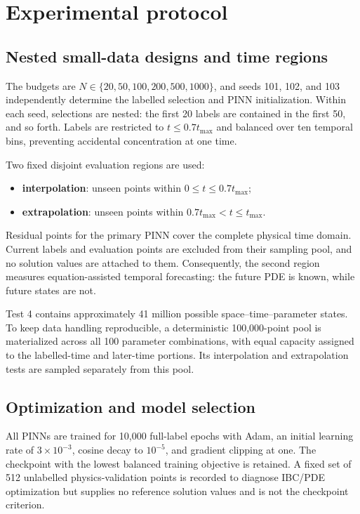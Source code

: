 \section{Experimental protocol}
\label{sec:protocol}

\subsection{Nested small-data designs and time regions}

The budgets are \(N\in\{20,50,100,200,500,1000\}\), and seeds 101, 102, and 103 independently determine the labelled selection and PINN initialization. Within each seed, selections are nested: the first 20 labels are contained in the first 50, and so forth. Labels are restricted to \(t\le0.7t_{\max}\) and balanced over ten temporal bins, preventing accidental concentration at one time.

Two fixed disjoint evaluation regions are used:
\begin{itemize}[leftmargin=*]
    \item \textbf{interpolation}: unseen points within \(0\le t\le0.7t_{\max}\);
    \item \textbf{extrapolation}: unseen points within \(0.7t_{\max}<t\le t_{\max}\).
\end{itemize}
Residual points for the primary PINN cover the complete physical time domain. Current labels and evaluation points are excluded from their sampling pool, and no solution values are attached to them. Consequently, the second region measures equation-assisted temporal forecasting: the future PDE is known, while future states are not.

Test 4 contains approximately 41 million possible space--time--parameter states. To keep data handling reproducible, a deterministic 100,000-point pool is materialized across all 100 parameter combinations, with equal capacity assigned to the labelled-time and later-time portions. Its interpolation and extrapolation tests are sampled separately from this pool.

\subsection{Optimization and model selection}

All PINNs are trained for 10,000 full-label epochs with Adam, an initial learning rate of \(3\times10^{-3}\), cosine decay to \(10^{-5}\), and gradient clipping at one. The checkpoint with the lowest balanced training objective is retained. A fixed set of 512 unlabelled physics-validation points is recorded to diagnose IBC/PDE optimization but supplies no reference solution values and is not the checkpoint criterion.

